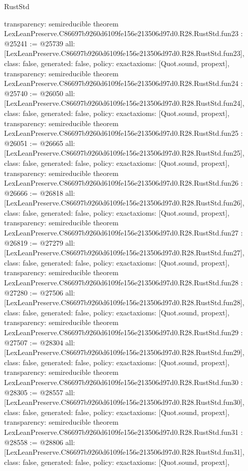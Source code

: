 \begin{lexlean}{RustStd}
\begin{coremodule}
{  transparency: semireducible
}
theorem LexLeanPreserve.C86697b9260d6109fe156e213506d97d0.R28.RustStd.fun23 : @25241 := @25739 {
  all: [LexLeanPreserve.C86697b9260d6109fe156e213506d97d0.R28.RustStd.fun23],
  class: false,
  generated: false,
  policy: exact{axioms: [Quot.sound, propext]},
  transparency: semireducible
}
theorem LexLeanPreserve.C86697b9260d6109fe156e213506d97d0.R28.RustStd.fun24 : @25740 := @26050 {
  all: [LexLeanPreserve.C86697b9260d6109fe156e213506d97d0.R28.RustStd.fun24],
  class: false,
  generated: false,
  policy: exact{axioms: [Quot.sound, propext]},
  transparency: semireducible
}
theorem LexLeanPreserve.C86697b9260d6109fe156e213506d97d0.R28.RustStd.fun25 : @26051 := @26665 {
  all: [LexLeanPreserve.C86697b9260d6109fe156e213506d97d0.R28.RustStd.fun25],
  class: false,
  generated: false,
  policy: exact{axioms: [Quot.sound, propext]},
  transparency: semireducible
}
theorem LexLeanPreserve.C86697b9260d6109fe156e213506d97d0.R28.RustStd.fun26 : @26666 := @26818 {
  all: [LexLeanPreserve.C86697b9260d6109fe156e213506d97d0.R28.RustStd.fun26],
  class: false,
  generated: false,
  policy: exact{axioms: [Quot.sound, propext]},
  transparency: semireducible
}
theorem LexLeanPreserve.C86697b9260d6109fe156e213506d97d0.R28.RustStd.fun27 : @26819 := @27279 {
  all: [LexLeanPreserve.C86697b9260d6109fe156e213506d97d0.R28.RustStd.fun27],
  class: false,
  generated: false,
  policy: exact{axioms: [Quot.sound, propext]},
  transparency: semireducible
}
theorem LexLeanPreserve.C86697b9260d6109fe156e213506d97d0.R28.RustStd.fun28 : @27280 := @27506 {
  all: [LexLeanPreserve.C86697b9260d6109fe156e213506d97d0.R28.RustStd.fun28],
  class: false,
  generated: false,
  policy: exact{axioms: [Quot.sound, propext]},
  transparency: semireducible
}
theorem LexLeanPreserve.C86697b9260d6109fe156e213506d97d0.R28.RustStd.fun29 : @27507 := @28304 {
  all: [LexLeanPreserve.C86697b9260d6109fe156e213506d97d0.R28.RustStd.fun29],
  class: false,
  generated: false,
  policy: exact{axioms: [Quot.sound, propext]},
  transparency: semireducible
}
theorem LexLeanPreserve.C86697b9260d6109fe156e213506d97d0.R28.RustStd.fun30 : @28305 := @28557 {
  all: [LexLeanPreserve.C86697b9260d6109fe156e213506d97d0.R28.RustStd.fun30],
  class: false,
  generated: false,
  policy: exact{axioms: [Quot.sound, propext]},
  transparency: semireducible
}
theorem LexLeanPreserve.C86697b9260d6109fe156e213506d97d0.R28.RustStd.fun31 : @28558 := @28806 {
  all: [LexLeanPreserve.C86697b9260d6109fe156e213506d97d0.R28.RustStd.fun31],
  class: false,
  generated: false,
  policy: exact{axioms: [Quot.sound, propext]},
}
\end{coremodule}
\end{lexlean}
